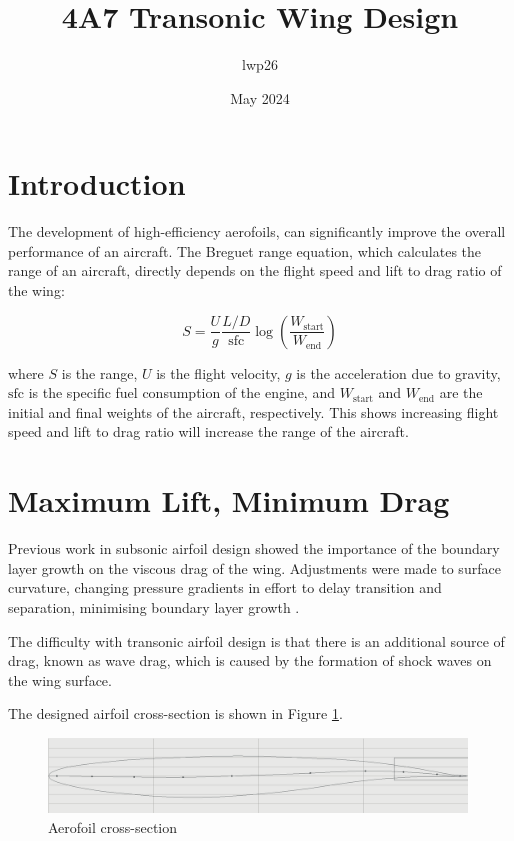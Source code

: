 \documentclass{article}
\begin{document}
\title{4A7 Transonic Wing Design}
\author{lwp26}
\date{May 2024}
\maketitle

\section{Introduction}


The development of high-efficiency aerofoils, can significantly improve the overall performance of an aircraft.
The Breguet range equation, which calculates the range of an aircraft, directly depends on the flight speed and lift to drag ratio of the wing:

\begin{equation}
S = \frac{U}{g}\frac{L/D}{\text{sfc}} \log \left( \frac{W_\text{start}}{W_\text{end}} \right)
\end{equation}

where $S$ is the range, $U$ is the flight velocity, $g$ is the acceleration due to gravity, $\text{sfc}$ is the specific fuel consumption of the engine, and $W_\text{start}$ and $W_\text{end}$ are the initial and final weights of the aircraft, respectively.
This shows increasing flight speed and lift to drag ratio will increase the range of the aircraft.

\section{Maximum Lift, Minimum Drag}

Previous work in subsonic airfoil design showed the importance of the boundary layer growth on the viscous drag of the wing.
Adjustments were made to surface curvature, changing pressure gradients in effort to delay transition and separation, minimising boundary layer growth \cite{SA1_report}.

The difficulty with transonic airfoil design is that there is an additional source of drag, known as wave drag, which is caused by the formation of shock waves on the wing surface.



The designed airfoil cross-section is shown in Figure \ref{fig:airfoil}.



\begin{figure}[H]
    \centering
    \includegraphics[width=0.99\textwidth]{figures/airfoil.png}
    \caption{Aerofoil cross-section}
    \label{fig:airfoil}
\end{figure}
\end{document}
